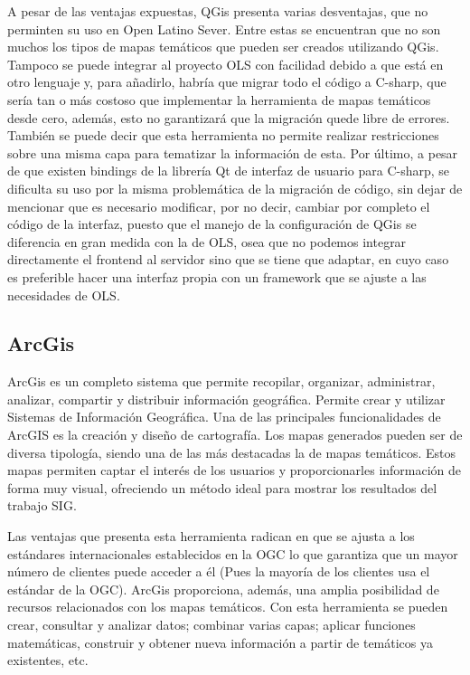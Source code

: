 A pesar de las ventajas expuestas, QGis presenta varias desventajas, que no perminten su uso en Open Latino Sever. Entre estas se encuentran que no son muchos los tipos de mapas tem\'aticos que pueden ser creados utilizando QGis. Tampoco se puede integrar al proyecto OLS con facilidad debido a que est\'a en otro lenguaje y, para a\~nadirlo, habr\'ia que migrar todo el c\'odigo a C-sharp, que ser\'ia tan o m\'as costoso que implementar la herramienta de mapas tem\'aticos desde cero, adem\'as, esto no garantizar\'a que la migraci\'on quede libre de errores. Tambi\'en se puede decir que esta herramienta no permite realizar restricciones sobre una misma capa para tematizar la informaci\'on de esta. Por \'ultimo, a pesar de que existen bindings de la librer\'ia Qt de interfaz de usuario para C-sharp, se dificulta su uso por la misma problem\'atica de la migraci\'on de c\'odigo, sin dejar de mencionar que es necesario modificar, por no decir, cambiar por completo el c\'odigo de la interfaz, puesto que el manejo de la configuraci\'on de QGis se diferencia en gran medida con la de OLS, osea que no podemos integrar directamente el frontend al servidor sino que se tiene que adaptar, en cuyo caso es preferible hacer una interfaz propia con un framework que se ajuste a las necesidades de OLS.


\subsection{ArcGis}
ArcGis es un completo sistema que permite recopilar, organizar, administrar, analizar, compartir y distribuir informaci\'on geogr\'afica. Permite crear y utilizar Sistemas de Informaci\'on Geogr\'afica. Una de las principales funcionalidades de ArcGIS es la creaci\'on y dise\~no de cartograf\'ia. Los mapas generados pueden ser de diversa tipolog\'ia, siendo una de las m\'as destacadas la de mapas tem\'aticos. Estos mapas permiten captar el inter\'es de los usuarios y proporcionarles informaci\'on de forma muy visual, ofreciendo un m\'etodo ideal para mostrar los resultados del trabajo SIG.

Las ventajas que presenta esta herramienta radican en que se ajusta a los est\'andares internacionales establecidos en la
OGC lo que garantiza que un mayor número de clientes puede acceder a \'el (Pues la mayor\'ia de los clientes usa el est\'andar de la OGC). ArcGis proporciona, adem\'as, una amplia posibilidad de recursos relacionados con los mapas tem\'aticos. Con esta herramienta se pueden crear, consultar y analizar datos; combinar varias capas; aplicar funciones matem\'aticas, construir y obtener nueva informaci\'on a partir de tem\'aticos ya existentes, etc.

